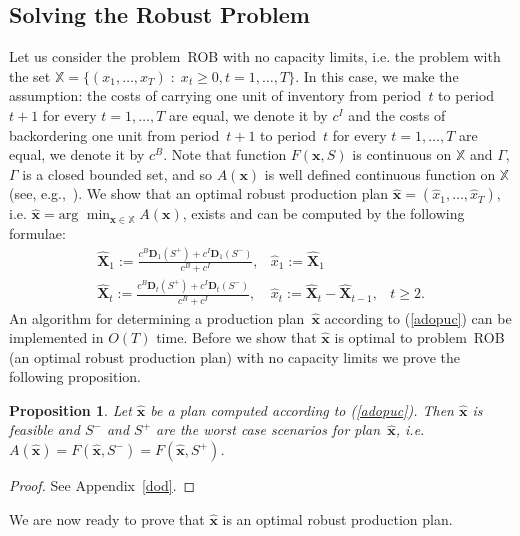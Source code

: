 \documentclass[11pt]{article}
\newtheorem{prop}{Proposition}
\newcommand{\Xset}{\mathbb{X}}
\begin{document}
\subsection{Solving the Robust Problem}
\label{ssrp}

Let us consider the problem~\textsc{ROB} with no capacity
limits, i.e. the problem with the set 
$\Xset=\{(x_1,\ldots,x_{T})\;:\;
x_t\geq 0, t=1,\ldots,T\}$.
In this case, we make  the assumption: 
the costs of carrying one unit of 
inventory from period~$t$ to period~$t+1$ 
for every $t=1,\ldots,T$
are equal,
we denote it by $c^I$  and
the costs  of backordering one unit 
from period~$t+1$ to period~$t$ for every $t=1,\ldots,T$
are equal,
we denote it by $c^B$. 
 Note that
function
$F(\pmb{x},S)$ is continuous on $\Xset$ and $\Gamma$,
$\Gamma$ is a closed bounded set, and so $A(\pmb{x})$ is 
well  defined continuous function on $\Xset$ (see, e.g.,~\cite[Theorem~1.4]{M70}).
We show that 
an optimal robust production plan $\hat{\pmb{x}}=(\hat{x}_1,\ldots,\hat{x}_{T})$, i.e. $\hat{\pmb{x}}=
\text{arg }\min_{\pmb{x}\in\Xset}A(\pmb{x})$,
exists and 
can be
computed by the following formulae:
\begin{equation}
\renewcommand{\arraystretch}{1.6}
\begin{array}{lll}
\hat{\mathbf{X}}_1:=\frac{c^{B} \mathbf{D}_1(S^{+})+c^{I}\mathbf{D}_1(S^{-})}{c^{B}+c^{I}},
& \hat{x}_1:=\hat{\mathbf{X}}_1&\\
\hat{\mathbf{X}}_t:=\frac{c^{B} \mathbf{D}_t(S^{+})+c^I\mathbf{D}_t(S^{-})}{c^{B}+c^{I}},& \hat{x}_t:=\hat{\mathbf{X}}_t-\hat{\mathbf{X}}_{t-1},& t\geq 2.
\end{array}
\label{adopuc}
\end{equation}
An algorithm for determining a production plan~$\hat{\pmb{x}}$ according to (\ref{adopuc})
can be implemented in $O(T)$ time. 
Before we show that $\hat{\pmb{x}}$ is optimal to  problem~\textsc{ROB}
(an optimal robust production plan)
 with no capacity
limits we prove the following proposition.
\begin{prop}
Let $\hat{\pmb{x}}$ be a plan computed according to (\ref{adopuc}). Then
$\hat{\pmb{x}}$ is feasible and
$S^{-}$ and $S^{+}$ are the worst case scenarios for 
plan~$\hat{\pmb{x}}$, i.e.
$A(\hat{\pmb{x}})=F(\hat{\pmb{x}},S^{-})=F(\hat{\pmb{x}},S^{+})$.
\label{pwcs}
\end{prop}
\begin{proof}
See Appendix~\ref{dod}.
\end{proof}
We are now ready to prove 
that $\hat{\pmb{x}}$ is an optimal robust production plan.
\end{document}
